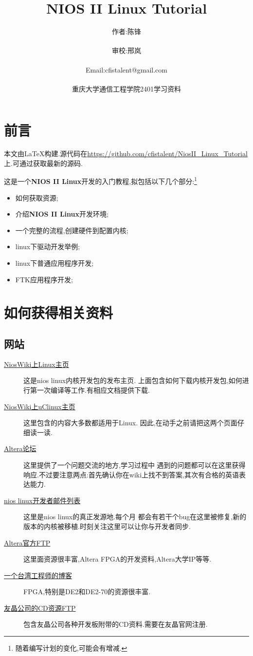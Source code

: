 \documentclass[12pt,a4paper,titlepage]{article}
\title{NIOS II Linux Tutorial}
\author{作者:陈锋\\\\审校:邢岚\\\\Email:cfistalent@gmail.com\\\\重庆大学通信工程学院2401学习资料}
\begin{document}
\thispagestyle{empty}
\maketitle{}
\section{前言}
本文由\LaTeX{}构建.源代码在\href{https://github.com/cfistalent/NiosII\_Linux\_Tutorial}{https://github.com/cfistalent/NiosII\_Linux\_Tutorial}
上.可通过获取最新的源码.

这是一个\textbf{NIOS II Linux}开发的入门教程,拟包括以下几个部分:\footnote{随着编写计划的变化,可能会有增减.}
\begin{itemize}
\item 如何获取资源;
\item 介绍\textbf{NIOS II Linux}开发环境;
\item 一个完整的流程,创建硬件到配置内核;
\item linux下驱动开发举例;
\item linux下普通应用程序开发;
\item FTK应用程序开发;
\end{itemize}
\newpage{}
\section{如何获得相关资料}
\subsection{网站}
\begin{description}
\item[\href{http://www.nioswiki.com/Linux}{NiosWiki上Linux主页}] 这是nios linux内核开发包的发布主页.
上面包含如何下载内核开发包,如何进行第一次编译等工作.有相应文档提供下载.
\item[\href{http://www.nioswiki.com/OperatingSystems/UClinux}{NiosWiki上uClinux主页}] 这里包含的内容大多数都适用于Linux.
因此,在动手之前请把这两个页面仔细读一读.
\item[\href{http://www.alteraforum.com/forum/forumdisplay.php?f=37}{Altera论坛}] 这里提供了一个问题交流的地方,学习过程中
遇到的问题都可以在这里获得响应.不过要注意两点:{首先确认你在wiki上找不到答案,其次有合格的英语表达能力}.
\item[\href{http://sopc.et.ntust.edu.tw/pipermail/nios2-dev/}{nios linux开发者邮件列表}] 这里是nios linux的真正发源地.每个月
都会有若干个bug在这里被修复,新的版本的内核被移植.时刻关注这里可以让你与开发者同步.
\item[\href{ftp://ftp.altera.com/up/pub/}{Altera官方FTP}] 这里面资源很丰富,Altera FPGA的开发资料,Altera大学IP等等.
\item[\href{http://www.cnblogs.com/oomusou/}{一个台湾工程师的博客}] FPGA,特别是DE2和DE2-70的资源很丰富.
\item[\href{http://www.terasic.com/downloads/cd-rom/}{友晶公司的CD资源FTP}] 包含友晶公司各种开发板附带的CD资料.需要在友晶官网注册.
\end{description}
\end{document}
